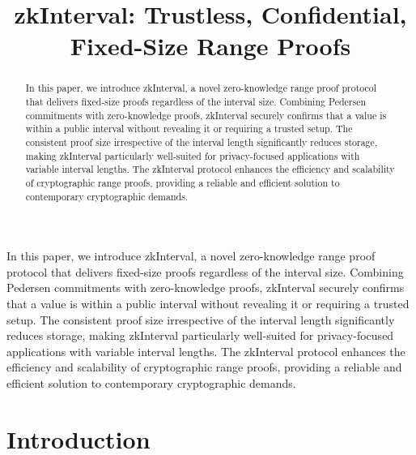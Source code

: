 \documentclass[version=preprint]{iacrcc}
\title[running = {zkInterval},
      ]{zkInterval: Trustless, Confidential, Fixed-Size Range Proofs}
\begin{document}
\maketitle


\begin{abstract}
  In this paper, we introduce zkInterval, a novel zero-knowledge range proof protocol that delivers fixed-size proofs regardless of the interval size. Combining Pedersen commitments with zero-knowledge proofs, zkInterval securely confirms that a value is within a public interval without revealing it or requiring a trusted setup. The consistent proof size irrespective of the interval length significantly reduces storage, making zkInterval particularly well-suited for privacy-focused applications with variable interval lengths. The zkInterval protocol enhances the efficiency and scalability of cryptographic range proofs, providing a reliable and efficient solution to contemporary cryptographic demands.
\end{abstract}

\begin{textabstract}
  In this paper, we introduce zkInterval, a novel zero-knowledge range proof protocol that delivers fixed-size proofs regardless of the interval size. Combining Pedersen commitments with zero-knowledge proofs, zkInterval securely confirms that a value is within a public interval without revealing it or requiring a trusted setup. The consistent proof size irrespective of the interval length significantly reduces storage, making zkInterval particularly well-suited for privacy-focused applications with variable interval lengths. The zkInterval protocol enhances the efficiency and scalability of cryptographic range proofs, providing a reliable and efficient solution to contemporary cryptographic demands.
\end{textabstract}

\section{Introduction}
\end{document}
